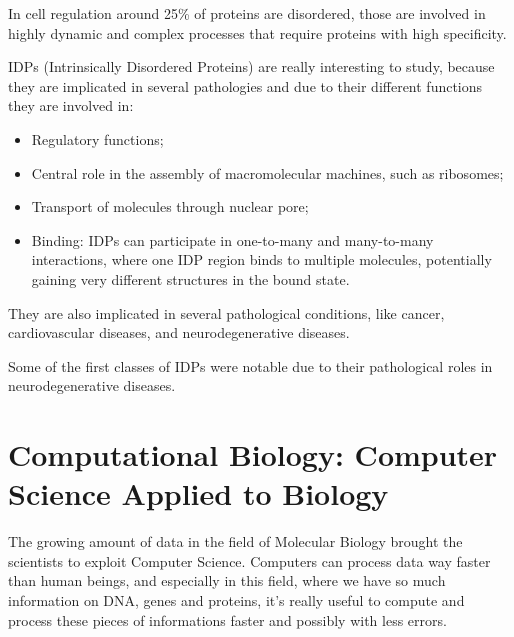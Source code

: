 In cell regulation around 25\% of proteins are disordered, those are involved in highly dynamic and complex processes that require proteins with high specificity.

IDPs (Intrinsically Disordered Proteins) are really interesting to study, because they are implicated in several pathologies and due to their different functions they are involved in:
\begin{itemize}
	\item Regulatory functions;
	\item Central role in the assembly of macromolecular machines, such as ribosomes;
	\item Transport of molecules through nuclear pore;
	\item Binding: IDPs can participate in one-to-many and many-to-many interactions, where one IDP region binds to multiple molecules, potentially gaining very different structures in the bound state.
\end{itemize}
 They are also implicated in several pathological conditions, like cancer, cardiovascular diseases, and neurodegenerative diseases. 

Some of the first classes of IDPs were notable due to their pathological roles in neurodegenerative diseases.

\vspace{20em}

\pagebreak

\section{Computational Biology: Computer Science Applied to Biology}
The growing amount of data in the field of Molecular Biology brought the scientists to exploit Computer Science. Computers can process data way faster than human beings, and especially in this field, where we have so much information on DNA, genes and proteins, it's really useful to compute and process these pieces of informations faster and possibly with less errors.

